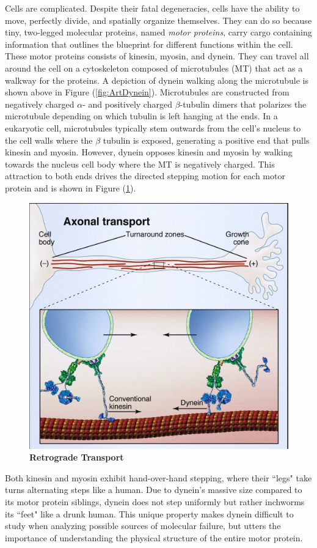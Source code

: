 Cells are complicated. Despite their fatal degeneracies, cells have the ability to move, perfectly divide, and spatially organize themselves. They can do so because tiny, two-legged molecular proteins, named \textit{motor proteins}, carry cargo containing information that outlines the blueprint for different functions within the cell. These motor proteins consists of kinesin, myosin, and dynein. They can travel all around the cell on a cytoskeleton composed of microtubules (MT) that act as a walkway for the proteins. A depiction of dynein walking along the microtubule is shown above in Figure (\ref{fig:ArtDynein}). Microtubules are constructed from negatively charged $\alpha$- and positively charged $\beta$-tubulin dimers that polarizes the microtubule depending on which tubulin is left hanging at the ends. In a eukaryotic cell, microtubules typically stem outwards from the cell's nucleus to the cell walls where the $\beta$ tubulin is exposed, generating a positive end that pulls kinesin and myosin. However, dynein opposes kinesin and myosin by walking towards the nucleus cell body where the MT is negatively charged. This attraction to both ends drives the directed stepping motion for each motor protein and is shown in Figure (\ref{fig:transport}). 

\begin{figure}[H]
	\centering
	\includegraphics[width=0.6\columnwidth]{Figures/retrograde_transport.jpg}
	\caption[Retrograde Transport]{\textbf{Retrograde Transport} \cite{Vale2003molecular}}
	\label{fig:transport}
\end{figure}

Both kinesin and myosin exhibit hand-over-hand stepping, where their ``legs" take turns alternating steps like a human. Due to dynein's massive size compared to its motor protein siblings, dynein does not step uniformly but rather inchworms its ``feet" like a drunk human. This unique property makes dynein difficult to study when analyzing possible sources of molecular failure, but utters the importance of understanding the physical structure of the entire motor protein.

